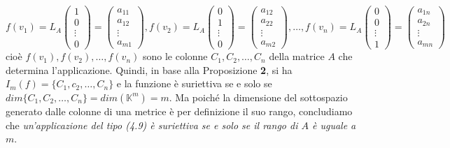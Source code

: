 \documentclass{book}
\begin{document}
\begin{equation*}
  f(v_1)=L_A
  \begin{pmatrix}
    1 \\
    0 \\
    \vdots\\
    0
  \end{pmatrix}=
  \begin{pmatrix}
    a_{11}\\
    a_{12}\\
    \vdots\\
    a_{m1}
  \end{pmatrix},
  f(v_2)= L_A
   \begin{pmatrix}
    0 \\
    1 \\
    \vdots\\
    0
   \end{pmatrix}=
   \begin{pmatrix}
    a_{12}\\
    a_{22}\\
    \vdots\\
    a_{m2}
   \end{pmatrix}, \dots, f(v_n)=
   L_A
   \begin{pmatrix}
    0\\
    0\\
    \vdots\\
    1
   \end{pmatrix}=
   \begin{pmatrix}
    a_{1n}\\
    a_{2n}\\
    \vdots\\
    a_{mn}    
   \end{pmatrix}
\end{equation*}
cioè $f(v_1),f(v_2),\dots,f(v_n)$ sono le colonne $C_1,C_2,\dots,C_n$ della matrice $A$ che determina
l'applicazione. Quindi, in base alla Proposizione \textbf{2}, si ha $I_m(f)=\{C_1,c_2,\dots,C_n\}$ e la funzione
è suriettiva se e solo se $dim\{C_1,C_2,\dots,C_n\}=dim(\mathds{K}^m)=m$. Ma poiché la dimensione del sottospazio
generato dalle colonne di una metrice è per definizione il suo rango, concludiamo che \textit{un'applicazione
  del tipo (4.9) è suriettiva se e solo se il rango di $A$ è uguale a $m$}.
\end{document}
